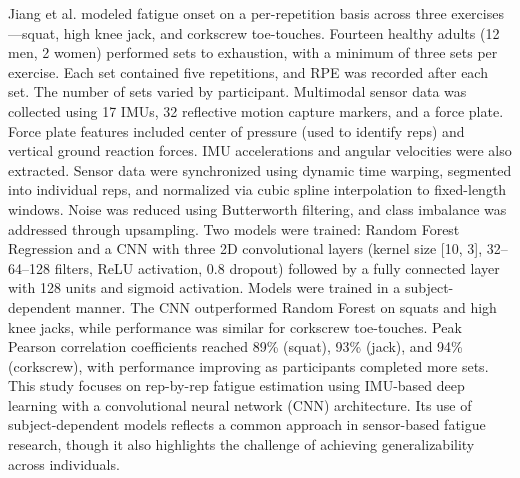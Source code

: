 \documentclass[conference]{IEEEtran}
\begin{document}
Jiang et al. \cite{jiang2021data} modeled fatigue onset on a per-repetition basis across three exercises—squat, high knee jack, and corkscrew toe-touches. Fourteen healthy adults (12 men, 2 women) performed sets to exhaustion, with a minimum of three sets per exercise. Each set contained five repetitions, and RPE was recorded after each set. The number of sets varied by participant. Multimodal sensor data was collected using 17 IMUs, 32 reflective motion capture markers, and a force plate. Force plate features included center of pressure (used to identify reps) and vertical ground reaction forces. IMU accelerations and angular velocities were also extracted. Sensor data were synchronized using dynamic time warping, segmented into individual reps, and normalized via cubic spline interpolation to fixed-length windows. Noise was reduced using Butterworth filtering, and class imbalance was addressed through upsampling. Two models were trained: Random Forest Regression and a CNN with three 2D convolutional layers (kernel size [10, 3], 32--64--128 filters, ReLU activation, 0.8 dropout) followed by a fully connected layer with 128 units and sigmoid activation. Models were trained in a subject-dependent manner. The CNN outperformed Random Forest on squats and high knee jacks, while performance was similar for corkscrew toe-touches. Peak Pearson correlation coefficients reached 89\% (squat), 93\% (jack), and 94\% (corkscrew), with performance improving as participants completed more sets. This study focuses on rep-by-rep fatigue estimation using IMU-based deep learning with a convolutional neural network (CNN) architecture. Its use of subject-dependent models reflects a common approach in sensor-based fatigue research, though it also highlights the challenge of achieving generalizability across individuals.
\end{document}
